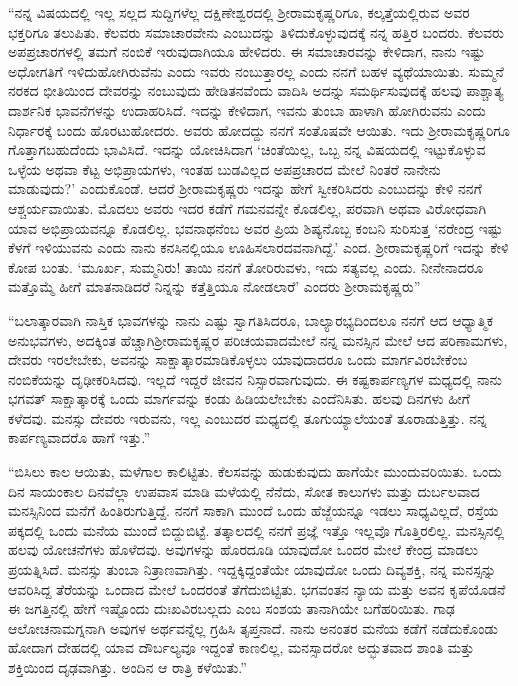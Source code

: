 “ನನ್ನ ವಿಷಯದಲ್ಲಿ ಇಲ್ಲ ಸಲ್ಲದ ಸುದ್ದಿಗಳೆಲ್ಲ ದಕ್ಷಿಣೇಶ್ವರದಲ್ಲಿ ಶ‍್ರೀರಾಮಕೃಷ್ಣರಿಗೂ, ಕಲ್ಕತ್ತೆಯಲ್ಲಿರುವ ಅವರ ಭಕ್ತರಿಗೂ ತಲುಪಿತು. ಕೆಲವರು ಸಮಾಚಾರವೇನು ಎಂಬುದನ್ನು ತಿಳಿದುಕೊಳ್ಳುವುದಕ್ಕೆ ನನ್ನ ಹತ್ತಿರ ಬಂದರು. ಕೆಲವರು ಅಪಪ್ರಚಾರಗಳಲ್ಲಿ ತಮಗೆ ನಂಬಿಕೆ ಇರುವುದಾಗಿಯೂ ಹೇಳಿದರು. ಈ ಸಮಾಚಾರವನ್ನು ಕೇಳಿದಾಗ, ನಾನು ಇಷ್ಟು ಅಧೋಗತಿಗೆ ಇಳಿದುಹೋಗಿರುವೆನು ಎಂದು ಇವರು ನಂಬುತ್ತಾರಲ್ಲ ಎಂದು ನನಗೆ ಬಹಳ ವ್ಯಥೆಯಾಯಿತು. ಸುಮ್ಮನೆ ನರಕದ ಭೀತಿಯಿಂದ ದೇವರನ್ನು ನಂಬುವುದು ಹೇಡಿತನವೆಂದು ವಾದಿಸಿ ಅದನ್ನು ಸಮರ್ಥಿಸುವುದಕ್ಕೆ ಹಲವು ಪಾಶ್ಚಾತ್ಯ ದಾರ್ಶನಿಕ ಭಾವನೆಗಳನ್ನು ಉದಾಹರಿಸಿದೆ. ಇದನ್ನು ಕೇಳಿದಾಗ, ಇವನು ತುಂಬಾ ಹಾಳಾಗಿ ಹೋಗಿರುವನು ಎಂದು ನಿರ್ಧಾರಕ್ಕೆ ಬಂದು ಹೊರಟುಹೋದರು. ಅವರು ಹೋದದ್ದು ನನಗೆ ಸಂತೊಷವೇ ಆಯಿತು. ಇದು ಶ‍್ರೀರಾಮಕೃಷ್ಣರಿಗೂ ಗೊತ್ತಾಗಬಹುದೆಂದು ಭಾವಿಸಿದೆ. ಇದನ್ನು ಯೋಚಿಸಿದಾಗ ‘ಚಿಂತೆಯಿಲ್ಲ, ಒಬ್ಬ ನನ್ನ ವಿಷಯದಲ್ಲಿ ಇಟ್ಟುಕೊಳ್ಳುವ ಒಳ್ಳೆಯ ಅಥವಾ ಕೆಟ್ಟ ಅಭಿಪ್ರಾಯಗಳು, ಇಂತಹ ಬುಡವಿಲ್ಲದ ಅಪಪ್ರಚಾರದ ಮೇಲೆ ನಿಂತರೆ ನಾನೇನು ಮಾಡುವುದು?’ ಎಂದುಕೊಂಡೆ. ಆದರೆ ಶ‍್ರೀರಾಮಕೃಷ್ಣರು ಇದನ್ನು ಹೇಗೆ ಸ್ವೀಕರಿಸಿದರು ಎಂಬುದನ್ನು ಕೇಳಿ ನನಗೆ ಆಶ್ಚರ್ಯವಾಯಿತು. ಮೊದಲು ಅವರು ಇದರ ಕಡೆಗೆ ಗಮನವನ್ನೇ ಕೊಡಲಿಲ್ಲ, ಪರವಾಗಿ ಅಥವಾ ವಿರೋಧವಾಗಿ ಯಾವ ಅಭಿಪ್ರಾಯವನ್ನೂ ಕೊಡಲಿಲ್ಲ. ಭವನಾಥನೆಂಬ ಅವರ ಪ್ರಿಯ ಶಿಷ್ಯನೊಬ್ಬ ಕಂಬನಿ ಸುರಿಸುತ್ತ ‘ನರೇಂದ್ರ ಇಷ್ಟು ಕೆಳಗೆ ಇಳಿಯುವನು ಎಂದು ನಾನು ಕನಸಿನಲ್ಲಿಯೂ ಊಹಿಸಲಾರದವನಾಗಿದ್ದೆ.’ ಎಂದ. ಶ‍್ರೀರಾಮಕೃಷ್ಣರಿಗೆ ಇದನ್ನು ಕೇಳಿ ಕೋಪ ಬಂತು. ‘ಮೂರ್ಖ, ಸುಮ್ಮನಿರು! ತಾಯಿ ನನಗೆ ತೋರಿರುವಳು, ಇದು ಸತ್ಯವಲ್ಲ ಎಂದು. ನೀನೇನಾದರೂ ಮತ್ತೊಮ್ಮೆ ಹೀಗೆ ಮಾತನಾಡಿದರೆ ನಿನ್ನನ್ನು ಕತ್ತೆತ್ತಿಯೂ ನೋಡಲಾರೆ’ ಎಂದರು ಶ‍್ರೀರಾಮಕೃಷ್ಣರು”

“ಬಲಾತ್ಕಾರವಾಗಿ ನಾಸ್ತಿಕ ಭಾವಗಳನ್ನು ನಾನು ಎಷ್ಟು ಸ್ವಾಗತಿಸಿದರೂ, ಬಾಲ್ಯಾರಭ್ಯದಿಂದಲೂ ನನಗೆ ಆದ ಆಧ್ಯಾತ್ಮಿಕ ಅನುಭವಗಳು, ಅದಕ್ಕಿಂತ ಹೆಚ್ಚಾಗಿ\break ಶ‍್ರೀರಾಮಕೃಷ್ಣರ ಪರಿಚಯವಾದಮೇಲೆ ನನ್ನ ಮನಸ್ಸಿನ ಮೇಲೆ ಆದ ಪರಿಣಾಮಗಳು, ದೇವರು ಇರಲೇಬೇಕು, ಅವನನ್ನು ಸಾಕ್ಷಾತ್ಕಾರಮಾಡಿಕೊಳ್ಳಲು ಯಾವುದಾದರೂ ಒಂದು ಮಾರ್ಗವಿರಬೇಕೆಂಬ ನಂಬಿಕೆಯನ್ನು ದೃಢೀಕರಿಸಿದವು. ಇಲ್ಲದೆ ಇದ್ದರೆ ಜೀವನ ನಿಸ್ಸಾರವಾಗುವುದು. ಈ ಕಷ್ಟಕಾರ್ಪಣ್ಯಗಳ ಮಧ್ಯದಲ್ಲಿ ನಾನು ಭಗವತ್ ಸಾಕ್ಷಾತ್ಕಾರಕ್ಕೆ ಒಂದು ಮಾರ್ಗವನ್ನು ಕಂಡು ಹಿಡಿಯಲೇಬೇಕು ಎಂದೆನಿಸಿತು. ಹಲವು ದಿನಗಳು ಹೀಗೆ ಕಳೆದವು. ಮನಸ್ಸು ದೇವರು ಇರುವನು, ಇಲ್ಲ ಎಂಬುದರ ಮಧ್ಯದಲ್ಲಿ ತೂಗುಯ್ಯಾಲೆಯಂತೆ ತೂರಾಡುತ್ತಿತ್ತು. ನನ್ನ ಕಾರ್ಪಣ್ಯವಾದರೊ ಹಾಗೆ ಇತ್ತು.”

“ಬಿಸಿಲು ಕಾಲ ಆಯಿತು, ಮಳೆಗಾಲ ಕಾಲಿಟ್ಟಿತು. ಕೆಲಸವನ್ನು ಹುಡುಕುವುದು ಹಾಗೆಯೇ ಮುಂದುವರಿಯಿತು. ಒಂದು ದಿನ ಸಾಯಂಕಾಲ ದಿನವೆಲ್ಲಾ ಉಪವಾಸ ಮಾಡಿ ಮಳೆಯಲ್ಲಿ ನೆನೆದು, ಸೋತ ಕಾಲುಗಳು ಮತ್ತು ದುರ್ಬಲವಾದ ಮನಸ್ಸಿನಿಂದ ಮನೆಗೆ ಹಿಂತಿರುಗುತ್ತಿದ್ದೆ. ನನಗೆ ಸಾಕಾಗಿ ಮುಂದೆ ಒಂದು ಹೆಜ್ಜೆಯನ್ನೂ ಇಡಲು ಸಾಧ್ಯವಿಲ್ಲದೆ, ರಸ್ತೆಯ ಪಕ್ಕದಲ್ಲಿ ಒಂದು ಮನೆಯ ಮುಂದೆ ಬಿದ್ದುಬಿಟ್ಟೆ. ತತ್ಕಾಲದಲ್ಲಿ ನನಗೆ ಪ್ರಜ್ಞೆ ಇತ್ತೊ ಇಲ್ಲವೊ ಗೊತ್ತಿರಲಿಲ್ಲ. ಮನಸ್ಸಿನಲ್ಲಿ ಹಲವು ಯೋಚನೆಗಳು ಹೊಳೆದವು. ಅವುಗಳನ್ನು ಹೊರದೂಡಿ ಯಾವುದೋ ಒಂದರ ಮೇಲೆ ಕೇಂದ್ರ ಮಾಡಲು ಪ್ರಯತ್ನಿಸಿದೆ. ಮನಸ್ಸು ತುಂಬಾ ನಿತ್ರಾಣವಾಗಿತ್ತು. ಇದ್ದಕ್ಕಿದ್ದಂತೆಯೇ ಯಾವುದೋ ಒಂದು ದಿವ್ಯಶಕ್ತಿ, ನನ್ನ ಮನಸ್ಸನ್ನು ಆವರಿಸಿದ್ದ ತೆರೆಯನ್ನು ಒಂದಾದ ಮೇಲೆ ಒಂದರಂತೆ ತೆಗೆದುಬಿಟ್ಟಿತು. ಭಗವಂತನ ನ್ಯಾಯ ಮತ್ತು ಅವನ ಕೃಪೆಯೊಡನೆ ಈ ಜಗತ್ತಿನಲ್ಲಿ ಹೇಗೆ ಇಷ್ಟೊಂದು ದುಃಖವಿರಬಲ್ಲದು ಎಂಬ ಸಂಶಯ ತಾನಾಗಿಯೇ ಬಗೆಹರಿಯಿತು. ಗಾಢ ಆಲೋಚನಾಮಗ್ನನಾಗಿ ಅವುಗಳ ಅರ್ಥವನ್ನೆಲ್ಲ ಗ್ರಹಿಸಿ ತೃಪ್ತನಾದೆ. ನಾನು ಅನಂತರ ಮನೆಯ ಕಡೆಗೆ ನಡೆದುಕೊಂಡು ಹೋದಾಗ ದೇಹದಲ್ಲಿ ಯಾವ ದೌರ್ಬಲ್ಯವೂ ಇದ್ದಂತೆ ಕಾಣಲಿಲ್ಲ, ಮನಸ್ಸಾದರೋ ಅದ್ಭುತವಾದ ಶಾಂತಿ ಮತ್ತು ಶಕ್ತಿಯಿಂದ ದೃಢವಾಗಿತ್ತು. ಅಂದಿನ ಆ ರಾತ್ರಿ ಕಳೆಯಿತು.”

